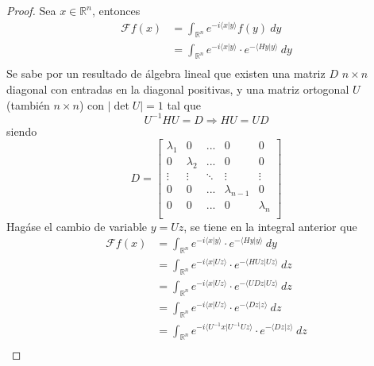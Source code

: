 \documentclass[12pt]{report}
\newcounter{it}
\theoremstyle{largebreak}
\newcommand\abs[1]{\ensuremath{\left|#1\right|}}
\newcommand\pint[2]{\ensuremath{\langle#1| #2\rangle}}
\newcommand{\fou}[1]{\ensuremath{\mathcal{F}#1}}
\begin{document}
\begin{proof}
        Sea $x\in\mathbb{R}^n$, entonces
        \begin{equation*}
            \begin{split}
                \fou{f}(x)&=\int_{\mathbb{R}^n}e^{ -i\pint{x}{y}}f(y)\:dy\\
                &=\int_{\mathbb{R}^n}e^{ -i\pint{x}{y}}\cdot e^{ -\pint{Hy}{y}}\:dy\\
            \end{split}
        \end{equation*}
        Se sabe por un resultado de álgebra lineal que existen una matriz $D$ $n\times n$ diagonal con entradas en la diagonal positivas, y una matriz ortogonal $U$ (también $n\times n$) con $\abs{\det U}=1$ tal que
        \begin{equation*}
            U^{-1}HU=D\Rightarrow HU=UD
        \end{equation*}
        siendo
        \begin{equation*}
            D=\left[
                \begin{array}{ccccc}
                    \lambda_1 & 0 & ... & 0 & 0\\
                    0 & \lambda_2 & ... & 0 & 0\\
                    \vdots & \vdots & \ddots & \vdots & \vdots \\
                    0 & 0 & ... & \lambda_{ n-1} & 0\\
                    0 & 0 & ... & 0 & \lambda_n\\
                \end{array}
             \right]
        \end{equation*}
        Hagáse el cambio de variable $y=Uz$, se tiene en la integral anterior que
        \begin{equation*}
            \begin{split}
                \fou{f}(x)&=\int_{\mathbb{R}^n}e^{ -i\pint{x}{y}}\cdot e^{ -\pint{Hy}{y}}\:dy\\
                &=\int_{\mathbb{R}^n}e^{ -i\pint{x}{Uz}}\cdot e^{ -\pint{HUz}{Uz}}\:dz\\
                &=\int_{\mathbb{R}^n}e^{ -i\pint{x}{Uz}}\cdot e^{ -\pint{UDz}{Uz}}\:dz\\
                &=\int_{\mathbb{R}^n}e^{ -i\pint{x}{Uz}}\cdot e^{-\pint{Dz}{z}}\:dz\\
                &=\int_{\mathbb{R}^n}e^{ -i\pint{U^{-1}x}{U^{-1}Uz}}\cdot e^{-\pint{Dz}{z}}\:dz\\

\end{split}
\end{equation*}
\end{proof}
\end{document}
